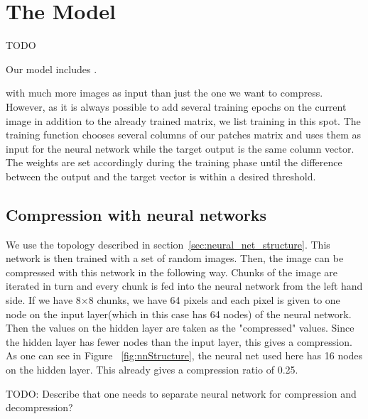 \section{The Model} \label{sec:model}
{\color{red} TODO }

Our model includes .


with much more images as input than just the one we want to compress. However, as it is always possible to add several training epochs on the current image in addition to the already trained matrix, we list training in this spot. The training function chooses several columns of our patches matrix and uses them as input for the neural network while the target output is the same column vector. The weights are set accordingly during the training phase until the difference between the output and the target vector is within a desired threshold.


\subsection{Compression with neural networks}
We use the topology described in section~\ref{sec:neural_net_structure}. This network is then trained with a set of random images. Then, the image can be compressed with this network in the following way. Chunks of the image are iterated in turn and every chunk is fed into the neural network from the left hand side. If we have 8$\times$8 chunks, we have 64 pixels and each pixel is given to one node on the input layer(which in this case has 64 nodes) of the neural network. Then the values on the hidden layer are taken as the "compressed" values. Since the hidden layer has fewer nodes than the input layer, this gives a compression. As one can see in Figure ~\ref{fig:nnStructure}, the neural net used here has 16 nodes on the hidden layer. This already gives a compression ratio of 0.25. 

TODO: Describe that one needs to separate neural network for compression and decompression?

